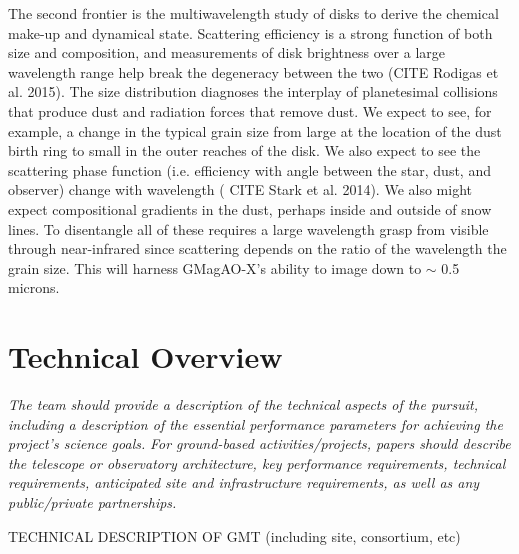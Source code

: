 \documentclass[12pt,preprint]{aastex}
\begin{document}
The second frontier is the multiwavelength study of disks to derive the
chemical make-up and dynamical state.  Scattering efficiency is a strong
function of both size and composition, and measurements of disk brightness
over a large wavelength range help break the degeneracy between the two
(CITE Rodigas et al. 2015). The size distribution diagnoses the interplay of
planetesimal collisions that produce dust and radiation forces that remove
dust. We expect to see, for example, a change in the typical grain size from
large at the location of the dust birth ring to small in the outer reaches of
the disk. We also expect to see the scattering phase function (i.e. efficiency
with angle between the star, dust, and observer) change with wavelength ( CITE Stark
et al. 2014). We also might expect compositional gradients in the dust,
perhaps inside and outside of snow lines. To disentangle all of these requires
a large wavelength grasp from visible through near-infrared since scattering
depends on the ratio of the wavelength the grain size. This will harness GMagAO-X's ability to
image down to $\sim$ 0.5 microns.




\section{Technical Overview}
\textit{The team should provide a description of the technical aspects of the
pursuit, including a description of the essential performance parameters for achieving the
project's science goals.}
\textit{For ground-based activities/projects, papers should describe the telescope or
observatory architecture, key performance requirements, technical requirements,
anticipated site and infrastructure requirements, as well as any public/private
partnerships.}

TECHNICAL DESCRIPTION OF GMT (including site, consortium, etc)
\end{document}

